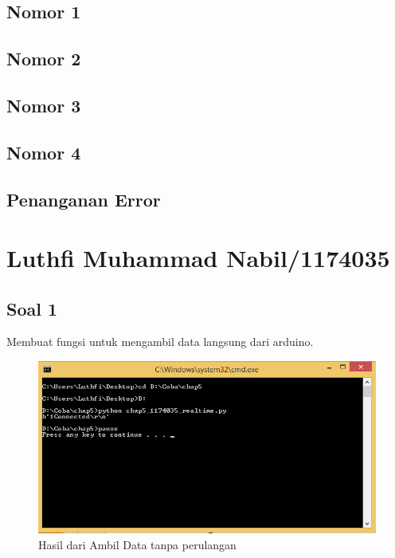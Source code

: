 	\subsection{Nomor 1}
		
		
	\subsection{Nomor 2}
		
	
	\subsection{Nomor 3}
		
	
	\subsection{Nomor 4}
		
		
	\subsection{Penanganan Error}
		
		
\section{Luthfi Muhammad Nabil/1174035}
	\subsection{Soal 1}
	Membuat fungsi untuk mengambil data langsung dari arduino. 
	
	\begin{figure}[H]
		\includegraphics[width=12cm]{figures/5/1174035/Praktek/ReadNonLoop.png}
		\centering
		\caption{Hasil dari Ambil Data tanpa perulangan}
	\end{figure}
